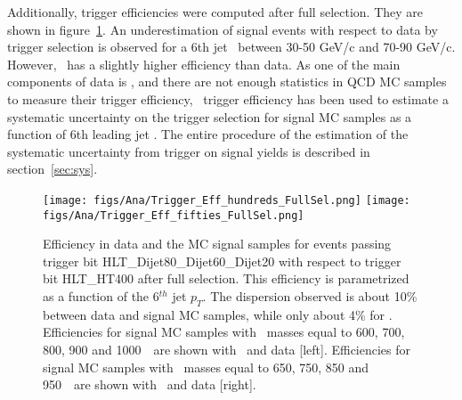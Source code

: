 Additionally, trigger efficiencies were computed after full selection. They are shown in figure~\ref{fig:TrigEffPostMH}. An underestimation of signal events with respect to data by trigger selection is observed for a 6th jet \pt~between 30-50 GeV/c and 70-90 GeV/c. However, \ttbar~has a slightly higher efficiency than data. As one of the main components of data is \ttbar, and there are not enough statistics in QCD MC samples to measure their trigger efficiency, \ttbar~trigger efficiency has been used to estimate a systematic uncertainty on the trigger selection for signal MC samples as a function of 6th leading jet \pt. The entire procedure of the estimation of the systematic uncertainty from trigger on signal yields is described in section~\ref{sec:sys}.
%

\begin{figure}[!Hhtbp]
  \begin{center}
    \texttt{[image: figs/Ana/Trigger\_Eff\_hundreds\_FullSel.png]}
    \texttt{[image: figs/Ana/Trigger\_Eff\_fifties\_FullSel.png]}
    \caption{Efficiency in data and the MC signal samples for events passing trigger bit HLT\_Dijet80\_Dijet60\_Dijet20 with respect to trigger bit HLT\_HT400 after full selection. This efficiency is parametrized as a function of the 6$^{th}$ jet $p_{T}$. The dispersion observed is about 10\% between data and signal MC samples, while only about 4\%  for \ttbar. Efficiencies for signal MC samples with \Tp~masses equal to 600, 700, 800, 900 and 1000~\GeVcc~are shown with \ttbar~and data [left]. Efficiencies for signal MC samples with \Tp~masses equal to 650, 750, 850 and 950~\GeVcc~are shown with \ttbar~and data [right].}
    \label{fig:TrigEffPostMH}
  \end{center}
\end{figure}

